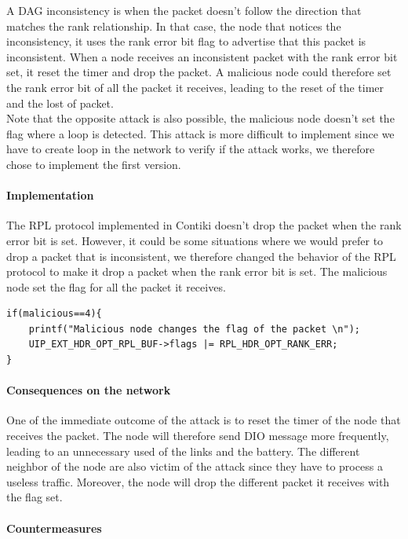 \documentclass[11pt]{report}
\begin{document}
A DAG inconsistency is when the packet doesn't follow the direction that
matches the rank relationship. In that case, the node that notices the
inconsistency, it uses the rank error bit flag to advertise that this
packet is inconsistent. When a node receives an inconsistent packet with
the rank error bit set, it reset the timer and drop the packet. A
malicious node could therefore set the rank error bit of all the packet
it receives, leading to the reset of the timer and the lost of packet.\\

Note that the opposite attack is also possible, the malicious node
doesn't set the flag where a loop is detected. This attack is more
difficult to implement since we have to create loop in the network to
verify if the attack works, we therefore chose to implement the first
version.

\paragraph{Implementation}
The \textsc{RPL} protocol implemented in Contiki doesn't drop the packet when
the rank error bit is set. However, it could be some situations where we would
prefer to drop a packet that is inconsistent, we therefore changed the behavior
of the \textsc{RPL} protocol to make it drop a packet when the rank error bit
is set. The malicious node set the flag for all the packet it receives.

\begin{lstlisting}[caption={DAG inconsistency attack 
done in the ext-header.c file }]
if(malicious==4){
	printf("Malicious node changes the flag of the packet \n");
	UIP_EXT_HDR_OPT_RPL_BUF->flags |= RPL_HDR_OPT_RANK_ERR;
}
\end{lstlisting}

\paragraph{Consequences on the network}
One of the immediate outcome of the attack is to reset the timer of the
node that receives the packet. The node will therefore send \textsc{DIO} message
more frequently, leading to an unnecessary used of the links and the
battery. The different neighbor of the node are also victim of the
attack since they have to process a useless traffic. Moreover, the node
will drop the different packet it receives with the flag set.

\paragraph{Countermeasures}
\end{document}
